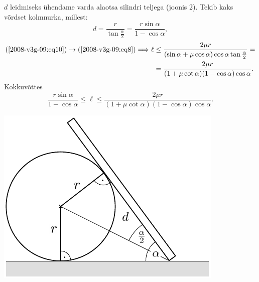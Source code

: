 \documentclass[10pt]{article}
\begin{document}
{$d$ leidmiseks ühendame varda alaotsa silindri teljega (joonis 2). Tekib kaks võrdset kolmnurka, millest:
\begin{equation}\label{2008-v3g-09:eq10}
d=\frac{r}{\tan \frac{\alpha}{2}}=\frac{r \sin \alpha}{1-\cos \alpha},
\end{equation}
\[
\begin{aligned}
(\ref{2008-v3g-09:eq10}) \rightarrow(\ref{2008-v3g-09:eq8}) \Longrightarrow \ell & \leq \frac{2 \mu r}{(\sin \alpha+\mu \cos \alpha) \cos \alpha \tan \frac{\alpha}{2}}=\\
&=\frac{2 \mu r}{(1+\mu \cot \alpha)(1-\cos \alpha) \cos \alpha} .
\end{aligned}
\]
Kokkuvõttes
\[
\frac{r \sin \alpha}{1-\cos \alpha} \leq \ell \leq \frac{2 \mu r}{(1+\mu \cot \alpha)(1-\cos \alpha) \cos \alpha}.
\]

\begin{center}
	\includegraphics[width=0.7\linewidth]{2008-v3g-09-lah2}
\end{center}
\probend
\bigskip


}
\end{document}
